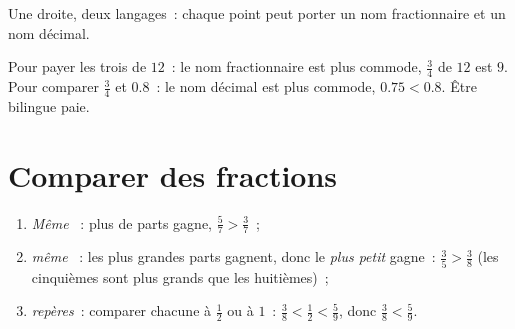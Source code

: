 \begin{omfigure}

{\small Une droite, deux langages~: chaque point peut porter un nom
fractionnaire et un nom décimal.}
\end{omfigure}

\begin{example}\label{ex:g5:fractions:choose}
Pour payer les trois  de $12$~: le nom fractionnaire est plus
commode, $\frac34$ de $12$ est $9$. Pour comparer $\frac34$ et
$0.8$~: le nom décimal est plus commode, $0.75 < 0.8$. Être
bilingue paie.
\end{example}

\section{Comparer des fractions}

\begin{method}\label{met:g5:fractions:compare}
\begin{enumerate}
  \item \emph{Même }~: plus de parts gagne,
        $\frac57 > \frac37$~;
  \item \emph{même }~: les plus grandes parts gagnent,
        donc le \emph{plus petit}  gagne~:
        $\frac35 > \frac38$ (les cinquièmes sont plus grands que
        les huitièmes)~;
  \item \emph{repères}~: comparer chacune à $\frac12$ ou à $1$~:
        $\frac38 < \frac12 < \frac59$, donc $\frac38 < \frac59$.
\end{enumerate}
\end{method}

